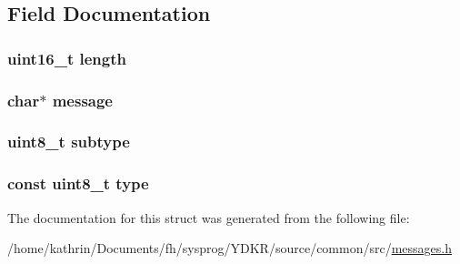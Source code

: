 \subsection{Field Documentation}
\hypertarget{structerror__warning_a1892eba2086d12ac2b09005aeb09ea3b}{
\subsubsection[{length}]{\setlength{\rightskip}{0pt plus 5cm}uint16\_\-t {\bf length}}}
\label{structerror__warning_a1892eba2086d12ac2b09005aeb09ea3b}
\hypertarget{structerror__warning_a0b2e8c7f76df48129f994ecc46d5c66c}{
\subsubsection[{message}]{\setlength{\rightskip}{0pt plus 5cm}char$\ast$ {\bf message}}}
\label{structerror__warning_a0b2e8c7f76df48129f994ecc46d5c66c}
\hypertarget{structerror__warning_a8613e2fef78de5c8994bc1b1ce55dc2f}{
\subsubsection[{subtype}]{\setlength{\rightskip}{0pt plus 5cm}uint8\_\-t {\bf subtype}}}
\label{structerror__warning_a8613e2fef78de5c8994bc1b1ce55dc2f}
\hypertarget{structerror__warning_aca7dafb0092715a03dd40f45fc607f2a}{
\subsubsection[{type}]{\setlength{\rightskip}{0pt plus 5cm}const uint8\_\-t {\bf type}}}
\label{structerror__warning_aca7dafb0092715a03dd40f45fc607f2a}


The documentation for this struct was generated from the following file:\begin{DoxyCompactItemize}
\item 
/home/kathrin/Documents/fh/sysprog/YDKR/source/common/src/\hyperlink{messages_8h}{messages.h}\end{DoxyCompactItemize}
